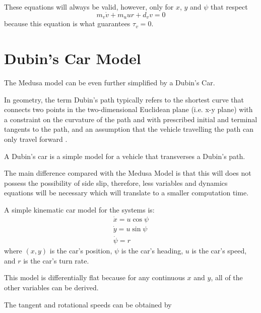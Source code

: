 \par These equations will always be valid, however, only for $x$, $y$ and $\psi$ that respect
\begin{equation}
    m_v \dot{v} + m_u u r + d_v v = 0
    \label{eq:onlymandatoryconstraint}
\end{equation}
because this equation is what guarantees $\tau_v = 0$. 


\section{Dubin's Car Model}
\label{sec:dubincarequations}

\par The Medusa model can be even further simplified by a Dubin's Car.
\par In geometry, the term Dubin's path typically refers to the shortest curve that connects two points in the two-dimensional Euclidean plane (i.e. x-y plane) with a constraint on the curvature of the path and with prescribed initial and terminal tangents to the path, and an assumption that the vehicle travelling the path can only travel forward \cite{Reeds1990OPTIMALPF}. 
\par A Dubin's car is a simple model for a vehicle that transverses a Dubin's path.
\par The main difference compared with the Medusa Model is that this will does not possess the possibility of side slip, therefore, less variables and dynamics equations will be necessary which will translate to a smaller computation time.

\par A simple kinematic car model for the systems is: 
\begin{equation}
    \begin{gathered}
        \dot{x} = u \cos \psi \\
        \dot{y} = u \sin \psi \\
        \dot{\psi} = r
    \end{gathered}
\end{equation}
where $(x,y)$ is the car's position, $\psi$ is the car's heading, $u$ is the car's speed, and $r$ is the car's turn rate.

\par This model is differentially flat because for any continuous $x$ and $y$, all of the other variables can be derived.
\par The tangent and rotational speeds can be obtained by
    

